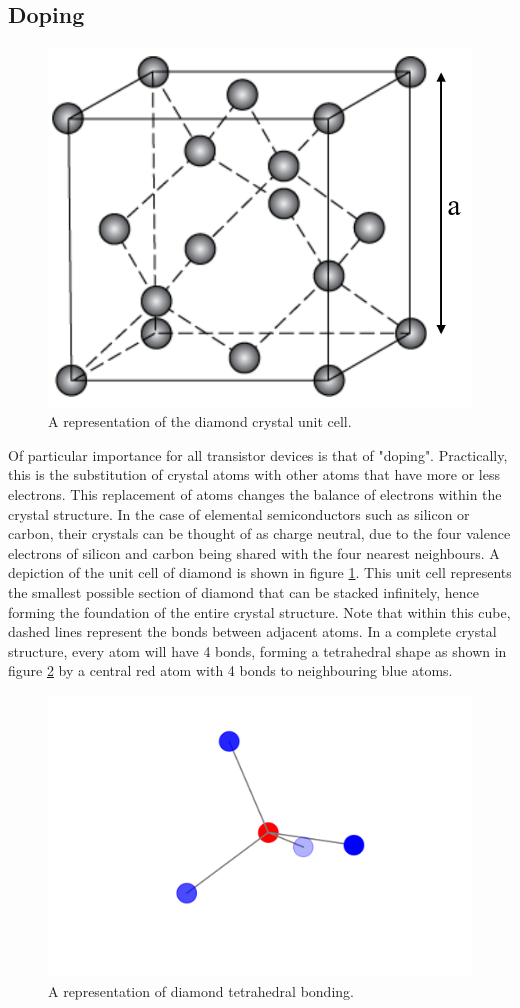 \begin{refsection}
\subsection{Doping}
\begin{figure}[H]
\centering
\includegraphics[width=0.3\linewidth]{Chapter1/gfx/diamond_structure.png}
\caption{A representation of the diamond crystal unit cell.}
\label{fig:diamond_structure}
\end{figure}
Of particular importance for all transistor devices is that of "doping". Practically, this is the substitution of crystal atoms with other atoms that have more or less electrons. This replacement of atoms changes the balance of electrons within the crystal structure. In the case of elemental semiconductors such as silicon or carbon, their crystals can be thought of as charge neutral, due to the four valence electrons of silicon and carbon being shared with the four nearest neighbours. A depiction of the unit cell of diamond is shown in figure \ref{fig:diamond_structure}. This unit cell represents the smallest possible section of diamond that can be stacked infinitely, hence forming the foundation of the entire crystal structure. Note that within this cube, dashed lines represent the bonds between adjacent atoms. In a complete crystal structure, every atom will have 4 bonds, forming a tetrahedral shape as shown in figure \ref{fig:tetrahedral} by a central red atom with 4 bonds to neighbouring blue atoms.
\begin{figure}[H]
\centering
\includegraphics[width=0.3\linewidth]{Chapter1/gfx/tetrahedral.png}
\caption{A representation of diamond tetrahedral bonding.}
\label{fig:tetrahedral}
\end{figure}

\end{refsection}

